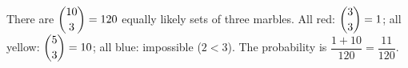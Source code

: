 There are $\dbinom{10}{3}=120$ equally likely sets of three marbles. All red: $\dbinom33=1$; all yellow: $\dbinom53=10$; all blue: impossible ($2<3$). The probability is $\dfrac{1+10}{120}=\boxed{\dfrac{11}{120}}$.
